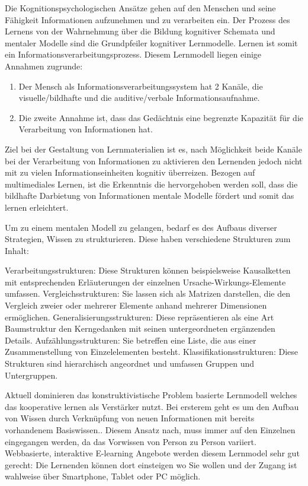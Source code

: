 \documentclass[a4paper, 12pt, twoside, BCOR=20mm, DIV=calc, abstracton, parskip=half*, toc=bibliography, toc=listof, headsepline, footsepline, headings=small, numbers=enddot]{scrreprt}
\begin{document}
	Die Kognitionspsychologischen Ansätze gehen auf den Menschen und seine Fähigkeit Informationen aufzunehmen und zu verarbeiten ein. Der Prozess des Lernens von der Wahrnehmung über die Bildung kognitiver Schemata und mentaler Modelle sind die Grundpfeiler kognitiver Lernmodelle. Lernen ist somit ein Informationsverarbeitungsprozess. Diesem Lernmodell liegen einige Annahmen zugrunde: 
	\begin{enumerate}
	\item Der Mensch als Informationsverarbeitungssystem hat 2 Kanäle, die visuelle/bildhafte und die auditive/verbale Informationsaufnahme. 
	\item Die zweite Annahme ist, dass das Gedächtnis eine begrenzte Kapazität für die Verarbeitung von Informationen hat.   
	\end{enumerate} 
	Ziel bei der Gestaltung von Lernmaterialien ist es, nach Möglichkeit beide Kanäle bei der Verarbeitung von Informationen zu aktivieren den Lernenden jedoch nicht mit zu vielen Informationseinheiten kognitiv überreizen. \cite{baumgart1998entwicklungs}
	Bezogen auf multimediales Lernen, ist die Erkenntnis die hervorgehoben werden soll, dass die bildhafte Darbietung von Informationen mentale Modelle fördert und somit das lernen erleichtert.
	
	Um zu einem mentalen Modell zu gelangen, bedarf es des Aufbaus diverser Strategien, Wissen zu strukturieren. Diese haben verschiedene Strukturen zum Inhalt:
	
	Verarbeitungsstrukturen: Diese Strukturen können beispielsweise Kausalketten mit entsprechenden Erläuterungen der einzelnen Ursache-Wirkungs-Elemente umfassen.
	Vergleichsstrukturen: Sie lassen sich als Matrizen darstellen, die den Vergleich zweier oder mehrerer Elemente anhand mehrerer Dimensionen ermöglichen.
	Generalisierungsstrukturen: Diese repräsentieren als eine Art Baumstruktur den Kerngedanken mit seinen untergeordneten ergänzenden Details.
	Aufzählungsstrukturen: Sie betreffen eine Liste, die aus einer Zusammenstellung von Einzelelementen besteht.
	Klassifikationsstrukturen: Diese Strukturen sind hierarchisch angeordnet und umfassen Gruppen und Untergruppen.
	
	Aktuell dominieren das konstruktivistische Problem basierte Lernmodell welches das kooperative lernen als Verstärker nutzt. Bei ersterem geht es um den Aufbau von Wissen durch Verknüpfung von neuen Informationen mit bereits vorhandenem Basiswissen.\cite[S.30-32]{issing2009online}. Diesem Ansatz nach, muss immer auf den Einzelnen eingegangen werden, da das Vorwissen von Person zu Person variiert. 
	Webbasierte, interaktive E-learning Angebote %
	werden diesem Lernmodel sehr gut gerecht: Die Lernenden können dort einsteigen wo Sie wollen und der Zugang ist wahlweise über Smartphone, Tablet oder PC möglich. 
	
\end{document}
